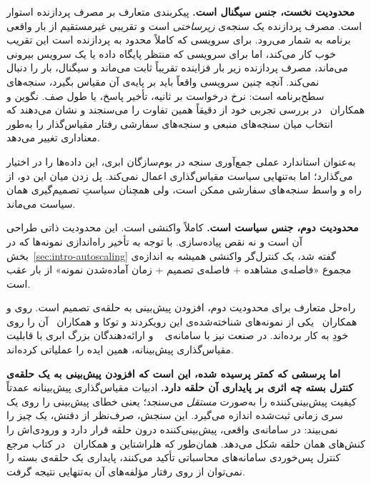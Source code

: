\textbf{محدودیت نخست، جنس سیگنال است.} پیکربندی متعارف  بر مصرف پردازنده استوار است.
مصرف پردازنده یک سنجه‌ی \emph{زیرساختی} است و تقریبی غیرمستقیم از بار واقعی برنامه به شمار
می‌رود. برای سرویسی که کاملاً محدود به پردازنده است این تقریب خوب کار می‌کند، اما برای سرویسی
که منتظر پایگاه داده یا یک سرویس بیرونی می‌ماند، مصرف پردازنده زیر بار فزاینده تقریباً ثابت
می‌ماند و سیگنال، بار را دنبال نمی‌کند. آنچه چنین سرویسی واقعاً باید بر پایه‌ی آن مقیاس بگیرد،
سنجه‌های سطح‌برنامه است: نرخ درخواست بر ثانیه، تأخیر
پاسخ، یا طول صف. نگوین و همکاران~\cite{nguyen2020} در بررسی تجربی خود از  دقیقاً همین
تفاوت را می‌سنجند و نشان می‌دهند که انتخاب میان سنجه‌های منبعی و سنجه‌های سفارشی
 رفتار مقیاس‌گذار را به‌طور معناداری تغییر می‌دهد.

 به‌عنوان استاندارد عملی جمع‌آوری سنجه در بوم‌سازگان ابری، این داده‌ها را در
اختیار می‌گذارد؛ اما به‌تنهایی سیاست مقیاس‌گذاری اعمال نمی‌کند. پل زدن میان این دو، از راه
 و واسط سنجه‌های سفارشی  ممکن است، ولی همچنان سیاستِ
تصمیم‌گیری همان سیاست  می‌ماند.

\textbf{محدودیت دوم، جنس سیاست است.}  کاملاً واکنشی است. این محدودیت ذاتی طراحی آن
است و نه نقص پیاده‌سازی. با توجه به تأخیر راه‌اندازی نمونه‌ها که در
بخش~\ref{sec:intro-autoscaling} گفته شد، یک کنترل‌گر واکنشی همیشه به اندازه‌ی مجموع
«فاصله‌ی مشاهده + فاصله‌ی تصمیم + زمان آماده‌شدن نمونه» از بار عقب است.

راه‌حل متعارف برای محدودیت دوم، افزودن پیش‌بینی به حلقه‌ی تصمیم است. روی و
همکاران~\cite{roy2011} یکی از نمونه‌های شناخته‌شده‌ی این رویکردند و توکا و
همکاران~\cite{toka2021} آن را روی خودِ  به کار برده‌اند. در صنعت نیز
 با سامانه‌ی ~\cite{scryer} و ارائه‌دهندگان بزرگ ابری با قابلیت
مقیاس‌گذاری پیش‌بینانه، همین ایده را عملیاتی کرده‌اند.

\textbf{اما پرسشی که کمتر پرسیده شده، این است که افزودن پیش‌بینی به یک حلقه‌ی کنترل بسته چه
اثری بر پایداری آن حلقه دارد.} ادبیات مقیاس‌گذاری پیش‌بینانه عمدتاً کیفیت پیش‌بینی‌کننده را
به‌صورت \emph{مستقل} می‌سنجد؛ یعنی خطای پیش‌بینی را روی یک سری زمانی ثبت‌شده اندازه می‌گیرد.
این سنجش، صرف‌نظر از دقتش، یک چیز را نمی‌بیند: در سامانه‌ی واقعی، پیش‌بینی‌کننده درون حلقه
قرار دارد و ورودی‌اش را کنش‌های همان حلقه شکل می‌دهد. همان‌طور که هلراشتاین و
همکاران~\cite{hellerstein2004} در کتاب مرجع کنترل پس‌خوردی سامانه‌های محاسباتی تأکید
می‌کنند، پایداری یک حلقه‌ی بسته را نمی‌توان از روی رفتار مؤلفه‌های آن به‌تنهایی نتیجه گرفت.

